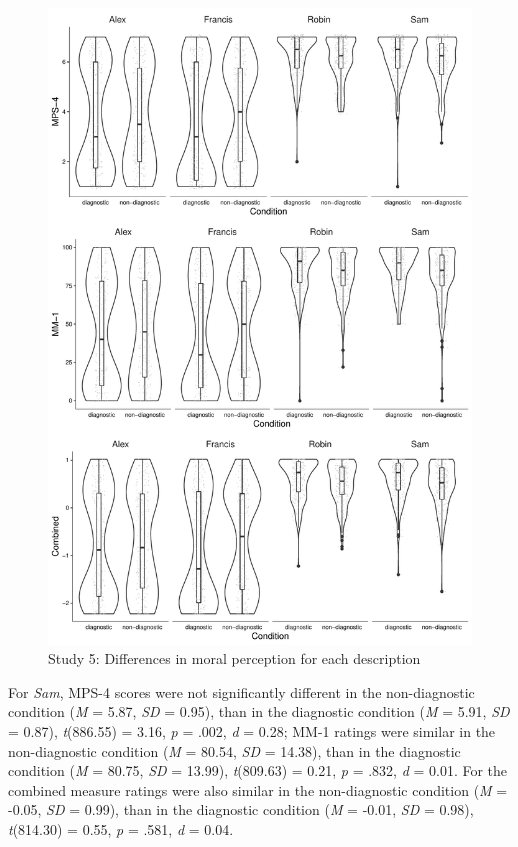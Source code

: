 \documentclass[
  american,
  man,floatsintext]{apa7}
\begin{document}
\begin{figure}[!p]
\includegraphics{Supplementary_files/figure-latex/S5allscenariosPlot-1} \caption{Study 5: Differences in moral perception for each description}\label{fig:S5allscenariosPlot}
\end{figure}

For \emph{Sam}, MPS-4 scores were not significantly different in the non-diagnostic condition (\emph{M} = 5.87, \emph{SD} = 0.95), than in the diagnostic condition (\emph{M} = 5.91, \emph{SD} = 0.87), \emph{t}(886.55) = 3.16, \emph{p} = .002, \emph{d} = 0.28; MM-1 ratings were similar in the non-diagnostic condition (\emph{M} = 80.54, \emph{SD} = 14.38), than in the diagnostic condition (\emph{M} = 80.75, \emph{SD} = 13.99), \emph{t}(809.63) = 0.21, \emph{p} = .832, \emph{d} = 0.01. For the combined measure ratings were also similar in the non-diagnostic condition (\emph{M} = -0.05, \emph{SD} = 0.99), than in the diagnostic condition (\emph{M} = -0.01, \emph{SD} = 0.98), \emph{t}(814.30) = 0.55, \emph{p} = .581, \emph{d} = 0.04.
\end{document}
